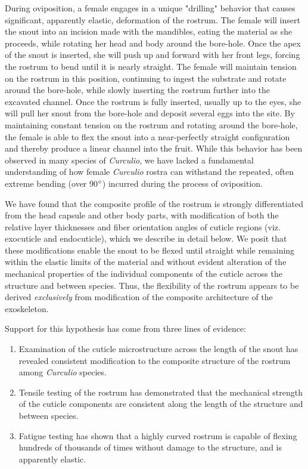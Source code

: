 \documentclass[twocolumn, linenumbers, superscriptaddress]{revtex4-1}
\begin{document}
	During oviposition, a female engages in a unique "drilling" behavior that causes significant, apparently elastic, deformation of the rostrum.
	The female will insert the snout into an incision made with the mandibles, eating the material as she proceeds, while rotating her head and body around the bore-hole.
	Once the apex of the snout is inserted, she will push up and forward with her front legs, forcing the rostrum to bend until it is nearly straight.
	The female will maintain tension on the rostrum in this position, continuing to ingest the substrate and rotate around the bore-hole, while slowly inserting the rostrum further into the excavated channel.
	Once the rostrum is fully inserted, usually up to the eyes, she will pull her snout from the bore-hole and deposit several eggs into the site.
	By maintaining constant tension on the rostrum and rotating around the bore-hole, the female is able to flex the snout into a near-perfectly straight configuration and thereby produce a linear channel into the fruit.
	While this behavior has been observed in many species of \textit{Curculio}, we have lacked a fundamental understanding of how female \textit{Curculio} rostra can withstand the repeated, often extreme bending (over 90$\degree$) incurred during the process of oviposition.

	We have found that the composite profile of the rostrum is strongly differentiated from the head capsule and other body parts, with modification of both the relative layer thicknesses and fiber orientation angles of cuticle regions (viz. exocuticle and endocuticle), which we describe in detail below.
	We posit that these modifications enable the snout to be flexed until straight while remaining within the elastic limits of the material and without evident alteration of the mechanical properties of the individual components of the cuticle across the structure and between species.
	Thus, the flexibility of the rostrum appears to be derived \emph{exclusively} from modification of the composite architecture of the exoskeleton.
	
	Support for this hypothesis has come from three lines of evidence: 
	\begin{enumerate}
	\item Examination of the cuticle microstructure across the length of the snout has revealed consistent modification to the composite structure of the rostrum among \textit{Curculio} species.
	\item Tensile testing of the rostrum has demonstrated that the mechanical strength of the cuticle components are consistent along the length of the structure and between species.
	\item Fatigue testing has shown that a highly curved rostrum is capable of flexing hundreds of thousands of times without damage to the structure, and is apparently elastic.
	\end{enumerate}
	
\end{document}
